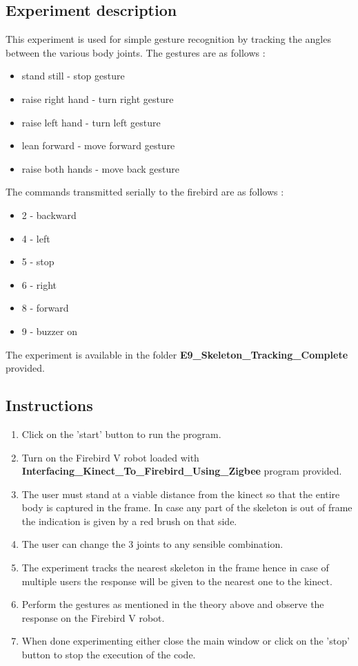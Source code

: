 \begin{flushleft}
\subsection{\textbf{ Experiment description}}
This experiment is used for simple gesture recognition by tracking the angles between the various body joints. The gestures are as follows :
 \begin{itemize}
\item stand still - stop gesture
\item raise right hand - turn right gesture
\item raise left hand - turn left gesture
\item lean forward - move forward gesture
\item raise both hands - move back gesture
 \end{itemize}
 The commands transmitted serially to the firebird are as follows :
 \begin{itemize}

 \item 2 - backward
 \item 4 - left
 \item 5 - stop
 \item 6 - right
 \item 8 - forward
 \item 9 - buzzer on
 \end{itemize}
\medskip

The experiment is available in the folder \textbf{E9\_Skeleton\_Tracking\_Complete} provided.
\medskip

\subsection{\textbf{ Instructions}}
\begin{enumerate}
\item Click on the 'start' button to run the program.
\item Turn on the Firebird V robot loaded with \textbf{Interfacing\_Kinect\_To\_Firebird\_Using\_Zigbee} program provided.
\item The user must stand at a viable distance from the kinect so that the entire body is captured in the frame. In case any part of the skeleton is out of frame the indication is given by a red brush on that side.
\item The user can change the 3 joints to any sensible combination.
\item The experiment tracks the nearest skeleton in the frame hence in case of multiple users the response will be given to the nearest one to the kinect.
\item Perform the gestures as mentioned in the theory above and observe the response on the Firebird V robot.
\item When done experimenting either close the main window or click on the 'stop' button to stop the execution of the code.


\end{enumerate}
\end{flushleft}
